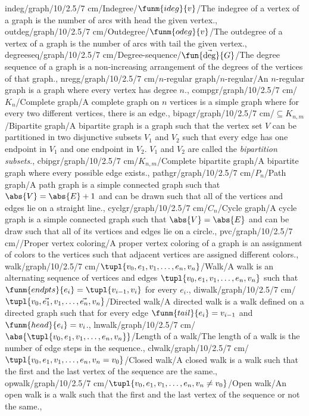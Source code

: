 indeg/graph/10/2.5/7 cm/{Indegree}/{$\funm{ideg}{v}$}/{The indegree of a vertex of a graph is the number of arcs with head the given vertex.},
outdeg/graph/10/2.5/7 cm/{Outdegree}/{$\funm{odeg}{v}$}/{The outdegree of a vertex of a graph is the number of arcs with tail the given vertex.},
degreeseq/graph/10/2.5/7 cm/{Degree-sequence}/{$\fun{\vec{\mbox{deg}}}{G}$}/{The degree sequence of a graph is a non-increasing arrangement of the degrees of the vertices of that graph.},
nregg/graph/10/2.5/7 cm/{$n$-regular graph}/{$n$-regular}/{An $n$-regular graph is a graph where every vertex has degree $n$.},
compgr/graph/10/2.5/7 cm/{$K_n$}/{Complete graph}/{A complete graph on $n$ vertices is a simple graph where for every two different vertices, there is an edge.},
bipagr/graph/10/2.5/7 cm/{$\subseteq K_{n,m}$}/{Bipartite graph}/{A bipartite graph is a graph such that the vertex set $V$ can be partitioned in two disjunctive subsets $V_1$ and $V_2$ such that every edge has one endpoint in $V_1$ and one endpoint in $V_2$. $V_1$ and $V_2$ are called the \emph{bipartition subsets}.},
cbipgr/graph/10/2.5/7 cm/{$K_{n,m}$}/{Complete bipartite graph}/{A bipartite graph where every possible edge exists.},
pathgr/graph/10/2.5/7 cm/{$P_n$}/{Path graph}/{A path graph is a simple connected graph such that $\abs{V}=\abs{E}+1$ and can be drawn such that all of the vertices and edges lie on a straight line.},
cyclgr/graph/10/2.5/7 cm/{$C_n$}/{Cycle graph}/{A cycle graph is a simple connected graph such that $\abs{V}=\abs{E}$ and can be draw such that all of its vertices and edges lie on a circle.},
pvc/graph/10/2.5/7 cm/{}/{Proper vertex coloring}/{A proper vertex coloring of a graph is an assignment of colors to the vertices such that adjacent vertices are assigned different colors.},
walk/graph/10/2.5/7 cm/{$\tupl{v_0,e_1,v_1,\ldots,e_n,v_n}$}/{Walk}/{A walk is an alternating sequence of vertices and edges $\tupl{v_0,e_1,v_1,\ldots,e_n,v_n}$ such that $\funm{endpts}{e_i}=\tupl{v_{i-1},v_i}$ for every $e_i$.},
diwalk/graph/10/2.5/7 cm/{$\tupl{v_0,\vec{e_1},v_1,\ldots,\vec{e_n},v_n}$}/{Directed walk}/{A directed walk is a walk defined on a directed graph such that for every edge $\funm{tail}{e_i}=v_{i-1}$ and $\funm{head}{e_i}=v_i$.},
lnwalk/graph/10/2.5/7 cm/{$\abs{\tupl{v_0,e_1,v_1,\ldots,e_n,v_n}}$}/{Length of a walk}/{The length of a walk is the number of edge steps in the sequence.},
clwalk/graph/10/2.5/7 cm/{$\tupl{v_0,e_1,v_1,\ldots,e_n,v_n=v_0}$}/{Closed walk}/{A closed walk is a walk such that the first and the last vertex of the sequence are the same.},
opwalk/graph/10/2.5/7 cm/{$\tupl{v_0,e_1,v_1,\ldots,e_n,v_n\neq v_0}$}/{Open walk}/{An open walk is a walk such that the first and the last vertex of the sequence or not the same.},
